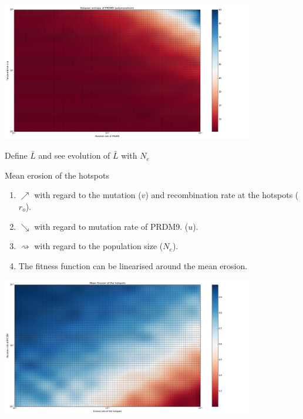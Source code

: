 \documentclass[10pt]{beamer}
\begin{document}
\begin{frame}
	\begin{center}
       \includegraphics[width=11cm]{Images/simpson-entropy-population-mutation.png}
	\end{center}
\end{frame}


\begin{frame}
	\begin{center}
	\Large
    Define $\bar{L}$ and see evolution of $\bar{L}$ with $N_e$
	\end{center}
\end{frame}

\begin{frame}
	\begin{center}
		\Large
    	Mean erosion of the hotspots
	\end{center}
	\begin{enumerate}
		\item $\nearrow$ with regard to the mutation ($v$) and recombination rate at the hotspots ($r_o$).
		
		\item $\searrow$ with regard to mutation rate of PRDM9. ($u$).
		
		\item $\rightsquigarrow$ with regard to the population size ($N_e$).
		
		\item 	The fitness function can be linearised around the mean erosion.
	\end{enumerate}
\end{frame}

\begin{frame}
	\begin{center}
       \includegraphics[width=11cm]{Images/mean-erosion-mutation-erosion.png}
	\end{center}
\end{frame}
\end{document}
